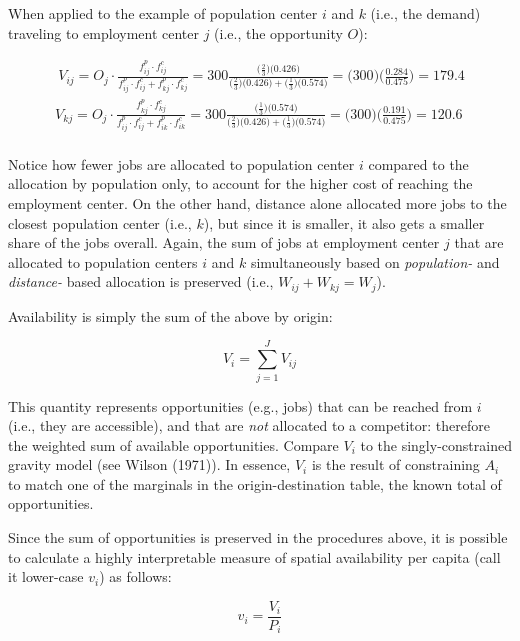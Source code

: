 \documentclass[]{elsarticle} %
\begin{document}
When applied to the example of population center \(i\) and \(k\) (i.e.,
the demand) traveling to employment center \(j\) (i.e., the opportunity
\(O\)):

\[
\begin{array}{l}\
V_{ij} = O_j\cdot \frac{f^p_{ij} \cdot f^c_{ij}}{f^p_{ij} \cdot f^c_{ij} + f^p_{kj} \cdot f^c_{kj}} = 300 \frac{\big(\frac{2}{3} \big) \big(0.426 \big)}{\big(\frac{2}{3} \big) \big(0.426 \big) + \big(\frac{1}{3} \big) \big(0.574 \big)} = \big(300 \big)\big(\frac{0.284}{0.475} \big)= 179.4\\
V_{kj} = O_j\cdot \frac{f^p_{kj} \cdot f^c_{kj}}{f^p_{ij} \cdot f^c_{ij} + f^p_{ik} \cdot f^c_{ik}} = 300 \frac{\big(\frac{1}{3} \big) \big(0.574 \big)}{\big(\frac{2}{3} \big) \big(0.426 \big) + \big(\frac{1}{3} \big) \big(0.574 \big)}  = \big(300 \big)\big(\frac{0.191}{0.475} \big)= 120.6 \\
\end{array}
\]

Notice how fewer jobs are allocated to population center \(i\) compared
to the allocation by population only, to account for the higher cost of
reaching the employment center. On the other hand, distance alone
allocated more jobs to the closest population center (i.e., \(k\)), but
since it is smaller, it also gets a smaller share of the jobs overall.
Again, the sum of jobs at employment center \(j\) that are allocated to
population centers \(i\) and \(k\) simultaneously based on
\emph{population-} and \emph{distance-} based allocation is preserved
(i.e., \(W_{ij} + W_{kj} = W_j\)).

Availability is simply the sum of the above by origin:

\[
V_i = \sum_{j=1}^J V_{ij}
\]

This quantity represents opportunities (e.g., jobs) that can be reached
from \(i\) (i.e., they are accessible), and that are \emph{not}
allocated to a competitor: therefore the weighted sum of available
opportunities. Compare \(V_i\) to the singly-constrained gravity model
(see Wilson (1971)). In essence, \(V_i\) is the result of constraining
\(A_i\) to match one of the marginals in the origin-destination table,
the known total of opportunities.

Since the sum of opportunities is preserved in the procedures above, it
is possible to calculate a highly interpretable measure of spatial
availability per capita (call it lower-case \(v_i\)) as follows:

\[
v_i = \frac{V_i}{P_i}
\]
\end{document}
